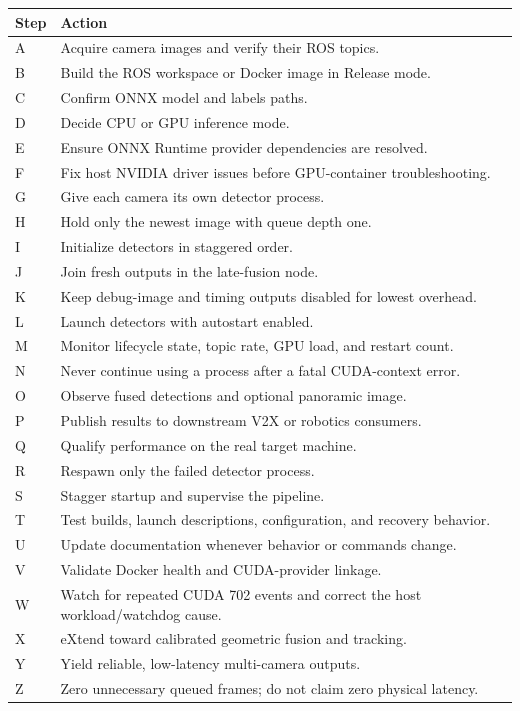 \documentclass[11pt,a4paper]{article}
\begin{document}
\begin{longtable}{p{} p{}}
\toprule
\textbf{Step} & \textbf{Action} \\
\midrule
\endhead
A & Acquire camera images and verify their ROS topics. \\
B & Build the ROS workspace or Docker image in Release mode. \\
C & Confirm ONNX model and labels paths. \\
D & Decide CPU or GPU inference mode. \\
E & Ensure ONNX Runtime provider dependencies are resolved. \\
F & Fix host NVIDIA driver issues before GPU-container troubleshooting. \\
G & Give each camera its own detector process. \\
H & Hold only the newest image with queue depth one. \\
I & Initialize detectors in staggered order. \\
J & Join fresh outputs in the late-fusion node. \\
K & Keep debug-image and timing outputs disabled for lowest overhead. \\
L & Launch detectors with autostart enabled. \\
M & Monitor lifecycle state, topic rate, GPU load, and restart count. \\
N & Never continue using a process after a fatal CUDA-context error. \\
O & Observe fused detections and optional panoramic image. \\
P & Publish results to downstream V2X or robotics consumers. \\
Q & Qualify performance on the real target machine. \\
R & Respawn only the failed detector process. \\
S & Stagger startup and supervise the pipeline. \\
T & Test builds, launch descriptions, configuration, and recovery behavior. \\
U & Update documentation whenever behavior or commands change. \\
V & Validate Docker health and CUDA-provider linkage. \\
W & Watch for repeated CUDA 702 events and correct the host workload/watchdog cause. \\
X & eXtend toward calibrated geometric fusion and tracking. \\
Y & Yield reliable, low-latency multi-camera outputs. \\
Z & Zero unnecessary queued frames; do not claim zero physical latency. \\
\bottomrule
\end{longtable}
\end{document}
